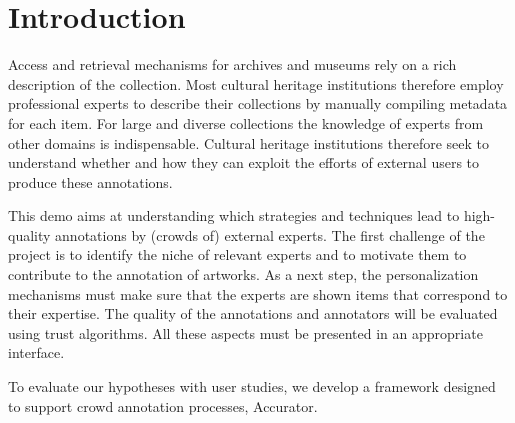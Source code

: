 \section{Introduction}\label{introduction}
Access and retrieval mechanisms for archives and museums rely on a rich description of the collection. 
Most cultural heritage institutions therefore employ professional experts to describe their collections by manually compiling metadata for each item. 
For large and diverse collections the knowledge of experts from other domains is indispensable.
Cultural heritage institutions therefore seek to understand whether and how they can exploit the efforts of external users to produce these annotations.

This demo aims at understanding which strategies and techniques lead to high-quality annotations by (crowds of) external experts. 
The first challenge of the project is to identify the niche of relevant experts and to motivate them to contribute to the annotation of artworks. 
As a next step, the personalization mechanisms must make sure that the experts are shown items that correspond to their expertise. 
The quality of the annotations and annotators will be evaluated using trust algorithms. 
All these aspects must be presented in an appropriate interface.

To evaluate our hypotheses with user studies, we develop a framework designed to support crowd annotation processes, Accurator. 
